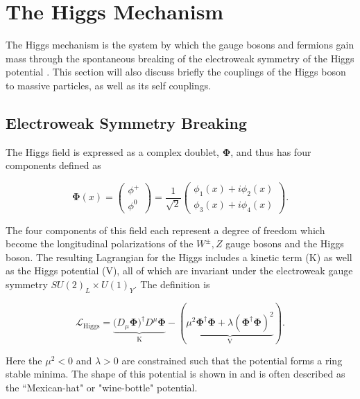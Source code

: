 \section{The Higgs Mechanism} \label{sec:theory:higgs}

The Higgs mechanism is the system by which the gauge bosons and fermions gain
mass through the spontaneous breaking of the electroweak symmetry of the Higgs
potential \cite{Higgs:1964ia,Higgs:1966ev,Thomson:2013zua}.  This section will
also discuss briefly the couplings of the Higgs boson to massive particles, as
well as its self couplings.

\subsection{Electroweak Symmetry Breaking}

The Higgs field is expressed as a complex doublet, $\boldsymbol{\Phi}$, and thus
has four components defined as

\begin{equation} \label{eq:higgs:higgs_field}
\boldsymbol{\Phi}(x) = \left( \begin{matrix} \phi^{+} \\ \phi^{0} \end{matrix}
\right) = \frac{1}{\sqrt{2}} \left( \begin{matrix} \phi_{1}(x) + i\phi_{2}(x) \\
\phi_{3}(x) + i\phi_{4}(x) \end{matrix} \right).
\end{equation}

The four components of this field each represent a degree of freedom which
become the longitudinal polarizations of the $W^{\pm},Z$ gauge bosons and the
Higgs boson.  The resulting Lagrangian for the Higgs includes a kinetic term
(K) as well as the Higgs potential (V), all of which are invariant under the
electroweak gauge symmetry $SU(2)_L \times U(1)_Y$.  The definition is

\begin{equation} \label{eq:higgs:lagrangian}
\mathcal{L}_{\text{Higgs}} =
\underbrace{(D_{\mu}\boldsymbol{\Phi)^{\dagger}}D^{\mu}\boldsymbol{\Phi}}_{\text{K}}
- (\underbrace{\mu^{2}\boldsymbol{\Phi}^{\dagger}\boldsymbol{\Phi} +
  \lambda(\boldsymbol{\Phi}^{\dagger}\boldsymbol{\Phi})^{2}}_{\text{V}}).
\end{equation}

Here the $\mu^{2} < 0$ and $\lambda > 0$ are constrained such that the
potential forms a ring stable minima.  The shape of this potential is shown in
 and is often described as the ``Mexican-hat" or
"wine-bottle" potential. 

